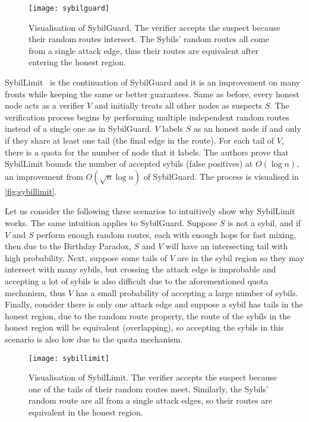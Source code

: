 \begin{figure}
  \centering
  \texttt{[image: sybilguard]}
  \caption{Visualisation of SybilGuard. The verifier accepts the suspect because
    their random routes intersect. The Sybils' random routes all come from a
    single attack edge, thus their routes are equivalent after entering the
    honest region.}
  \label{fig:sybilguard}
\end{figure}

SybilLimit~\cite{yu2008sybillimit} is the continuation of SybilGuard and it is
an improvement on many fronts while keeping the same or better guarantees. Same
as before, every honest node acts as a verifier $V$ and initially treats all
other nodes as suspects $S$. The verification process begins by performing
multiple independent random routes instead of a single one as in SybilGuard. $V$
labels $S$ as an honest node if and only if they share at least one tail (the
final edge in the route). For each tail of $V$, there is a quota for the number
of node that it labels. The authors prove that SybilLimit bounds the number of
accepted sybils (false positives) at $O(\log{n})$, an improvement from
$O(\sqrt{n} \log{n})$ of SybilGuard. The process is visualised in
\autoref{fig:sybillimit}.

Let us consider the following three scenarios to intuitively show why SybilLimit
works. The same intuition applies to SybilGuard. Suppose $S$ is not a sybil, and
if $V$ and $S$ perform enough random routes, each with enough hops for fast
mixing, then due to the Birthday Paradox, $S$ and $V$ will have an intersecting
tail with high probability. Next, suppose some tails of $V$ are in the
sybil region so they may intersect with many sybils, but crossing
the attack edge is improbable and accepting a lot of sybils is also difficult
due to the aforementioned quota mechanism, thus $V$ has a small probability of
accepting a large number of sybils. Finally, consider there is only one attack
edge and suppose a sybil has tails in the honest region, due to the random route
property, the route of the sybils in the honest region will be equivalent
(overlapping), so accepting the sybils in this scenario is also low due to the
quota mechanism.

\begin{figure}
  \centering
  \texttt{[image: sybillimit]}
  \caption{Visualisation of SybilLimit. The verifier accepts the suspect because
    one of the tails of their random routes meet. Similarly, the Sybils' random
    route are all from a single attack edges, so their routes are equivalent in
    the honest region.}
  \label{fig:sybillimit}
\end{figure}

